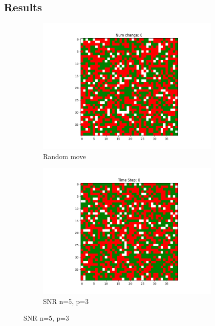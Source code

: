 \documentclass[11pt]{article}
\begin{document}
\subsection{Results}
	\begin{figure}[h]
		\centering
		\begin{subfigure}{0.14\textwidth}
			\includegraphics[width=\linewidth]{initial_random.png}
			\caption{\centering Random move}
		\end{subfigure}\hfill
		\begin{subfigure}{0.14\textwidth}
			\includegraphics[width=\linewidth]{initial_social_n5p3.png}
			\caption{\centering SNR n=5, p=3}
		\end{subfigure}\hfill

\end{figure}
\end{document}

